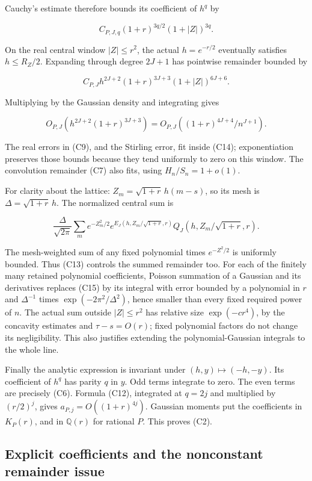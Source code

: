 Cauchy's estimate therefore bounds its coefficient of \(h^q\) by

\[
 C_{P,J,q}(1+r)^{3q/2}(1+|Z|)^{3q}.
 \tag{C12}\label{tcl:eq:C12}
\]

On the real central window \(|Z|\le r^2\), the actual \(h=e^{-r/2}\)
eventually satisfies \(h\le R_Z/2\). Expanding through degree \(2J+1\)
has pointwise remainder bounded by

\[
 C_{P,J}h^{2J+2}(1+r)^{3J+3}(1+|Z|)^{6J+6}.
 \tag{C13}\label{tcl:eq:C13}
\]

Multiplying by the Gaussian density and integrating gives

\[
 O_{P,J}(h^{2J+2}(1+r)^{3J+3})
 =O_{P,J}((1+r)^{4J+4}/n^{J+1}).
 \tag{C14}\label{tcl:eq:C14}
\]

The real errors in (C9), and the Stirling error, fit inside (C14);
exponentiation preserves those bounds because they tend uniformly to
zero on this window. The convolution remainder (C7) also fits, using
\(H_n/S_n=1+o(1)\).

For clarity about the lattice: \(Z_m=\sqrt{1+r}\,h(m-s)\), so its mesh
is \(\Delta=\sqrt{1+r}\,h\). The normalized central sum is

\[
 \frac{\Delta}{\sqrt{2\pi}}\sum_m e^{-Z_m^2/2}
 e^{E_J(h,Z_m/\sqrt{1+r},r)}Q_J(h,Z_m/\sqrt{1+r},r).
 \tag{C15}\label{tcl:eq:C15}
\]

The mesh-weighted sum of any fixed polynomial times \(e^{-Z^2/2}\) is
uniformly bounded. Thus (C13) controls the summed remainder too. For
each of the finitely many retained polynomial coefficients, Poisson
summation of a Gaussian and its derivatives replaces (C15) by its
integral with error bounded by a polynomial in \(r\) and \(\Delta^{-1}\)
times \(\exp(-2\pi^2/\Delta^2)\), hence smaller than every fixed
required power of \(n\). The actual sum outside \(|Z|\le r^2\) has
relative size \(\exp(-cr^4)\), by the concavity estimates and
\(\tau-s=O(r)\); fixed polynomial factors do not change its
negligibility. This also justifies extending the polynomial-Gaussian
integrals to the whole line.

Finally the analytic expression is invariant under
\((h,y)\mapsto(-h,-y)\). Its coefficient of \(h^q\) has parity \(q\) in
\(y\). Odd terms integrate to zero. The even terms are precisely (C6).
Formula (C12), integrated at \(q=2j\) and multiplied by \((r/2)^j\),
gives \(a_{P,j}=O((1+r)^{4j})\). Gaussian moments put the coefficients
in \(K_P(r)\), and in \(\mathbb{Q}(r)\) for rational \(P\). This proves
(C2).

\subsection{Explicit coefficients and the nonconstant remainder
issue}\label{tcl:explicit-coefficients-and-the-nonconstant-remainder-issue}

